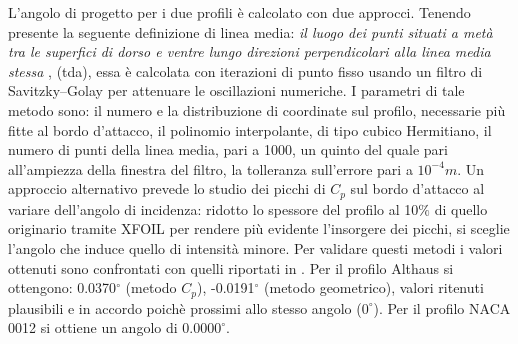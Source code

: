 \documentclass{jfm}
\begin{document}
L'angolo di progetto per i due profili è calcolato con due approcci. Tenendo presente la seguente definizione di linea media: \textit{il luogo dei punti situati a metà tra le  superfici di dorso e ventre lungo direzioni perpendicolari alla linea media stessa} \cite{Foa}, (tda), essa è calcolata con iterazioni di punto fisso usando un filtro di Savitzky–Golay per attenuare le oscillazioni numeriche. I parametri di tale metodo sono: il numero e la distribuzione di coordinate sul profilo, necessarie più fitte al bordo d'attacco, il polinomio interpolante, di tipo cubico Hermitiano, il numero di punti della linea media, pari a 1000, un quinto del quale pari all'ampiezza della finestra del filtro, la tolleranza sull'errore pari a $10^{-4}m$. Un approccio alternativo prevede lo studio dei picchi di $C_p$ sul bordo d'attacco al variare dell'angolo di incidenza: ridotto lo spessore del profilo al 10$\%$ di quello originario tramite XFOIL per rendere più evidente l'insorgere dei picchi, si sceglie l'angolo che induce quello di intensità minore. Per validare questi metodi i valori ottenuti sono confrontati con quelli riportati in \cite{TWS}.
Per il profilo Althaus si ottengono: 0.0370$^{\circ}$ (metodo $C_p$), -0.0191$^{\circ}$ (metodo geometrico), valori ritenuti plausibili e in accordo poichè prossimi allo stesso angolo ($0^{\circ}$). Per il profilo NACA 0012 si ottiene un angolo di $0.0000^{\circ}$.
\end{document}
